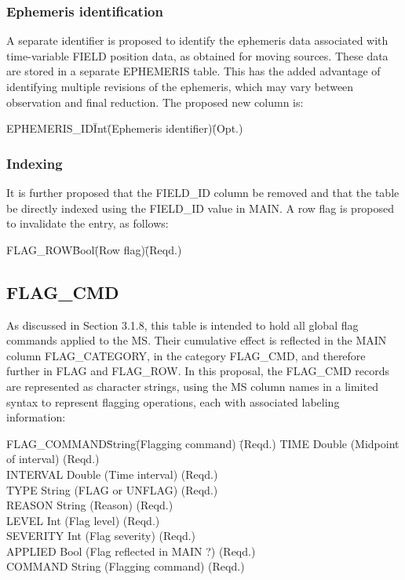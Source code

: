 \documentclass{article}
\begin{document}
\subsubsection{Ephemeris identification}

A separate identifier is proposed to identify the ephemeris data
associated with time-variable FIELD position data, as obtained for
moving sources. These data are stored in a separate EPHEMERIS
table. This has the added advantage of identifying multiple revisions
of the ephemeris, which may vary between observation and final
reduction. The proposed new column is:

\begin{tabbing} 
EPHEMERIS\_ID\quad\quad  \= Int\quad\quad\quad\quad \= 
(Ephemeris identifier)\quad\quad\quad\quad \= (Opt.) \\
\end{tabbing}

\subsubsection{Indexing}

It is further proposed that the FIELD\_ID column be removed and that
the table be directly indexed using the FIELD\_ID value in MAIN. A
row flag is proposed to invalidate the entry, as follows:

\begin{tabbing}
FLAG\_ROW\quad\quad  \= Bool\quad\quad \= (Row flag)\quad\quad \= (Reqd.)\\
\end{tabbing}

\subsection{FLAG\_CMD}

As discussed in Section 3.1.8, this table is intended to hold all
global flag commands applied to the MS. Their cumulative effect is
reflected in the MAIN column FLAG\_CATEGORY, in the category FLAG\_CMD,
and therefore further in FLAG and FLAG\_ROW. In this proposal, the
FLAG\_CMD records are represented as character strings, using the MS
column names in a limited syntax to represent flagging operations,
each with associated labeling information:

\begin{tabbing} 
FLAG\_COMMAND\quad\quad\quad\quad \= String\quad\quad \= (Flagging command)
\quad\quad\quad\quad \= (Reqd.) \kill
TIME \> Double \> (Midpoint of interval) \> (Reqd.) \\
INTERVAL \> Double \> (Time interval) \> (Reqd.) \\
TYPE \> String \> (FLAG or UNFLAG) \> (Reqd.) \\
REASON \> String \> (Reason) \> (Reqd.) \\
LEVEL  \> Int    \> (Flag level) \> (Reqd.) \\
SEVERITY \> Int \> (Flag severity) \> (Reqd.) \\
APPLIED \> Bool \> (Flag reflected in MAIN ?) \> (Reqd.) \\
COMMAND \> String \> (Flagging command) \> (Reqd.) \\
\end{tabbing}
\end{document}
